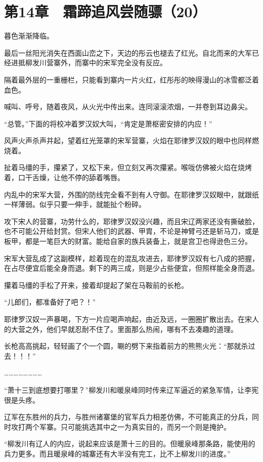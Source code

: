 \section{第14章　霜蹄追风尝随骠（20）}

暮色渐渐降临。

最后一丝阳光消失在西面山峦之下，天边的彤云也褪去了红光。自北而来的大军已经进抵柳发川营寨外，而寨中的宋军完全没有反应。

隔着最外层的一重栅栏，只能看到寨内一片火红，红彤彤的映得漫山的冰雪都泛着血色。

喊叫、呼号，随着夜风，从火光中传出来。连同滚滚浓烟，一并卷到耳边鼻尖。

“总管。”下面的将校冲着罗汉奴大叫，“肯定是萧枢密安排的内应！”

风声火声杀声并起，望着红光笼罩的宋军营寨，火焰在耶律罗汉奴的眼中也同样燃烧着。

扯着马缰的手，攥紧了，又松下来，但立刻又再次攥紧。喉咙仿佛被火焰在烧烤着，口干舌燥，让他不停的舔着嘴唇。

内乱中的宋军大营，外围的防线完全看不到有人守御。在耶律罗汉奴眼中，就跟纸一样薄弱。似乎只要一伸手，就能扯个粉碎。

攻下宋人的营寨，功劳什么的，耶律罗汉奴没兴趣，而且宋辽两家还没有撕破脸，也不可能公开给封赏。但宋人他们的武器、甲胄，不论是神臂弓还是斩马刀，或是板甲，都是一笔巨大的财富。能给自家的族兵装备上，就是宫卫也得逊色三分。

宋军大营乱成了这副模样，趁着现在的混乱攻进去，耶律罗汉奴有七八成的把握，在占尽便宜后能全身而退。剩下的两三成，则是少占些便宜，但照样能全身而退。

攥着马缰的手松了开来，接着却提起了架在马鞍前的长枪。

“儿郎们，都准备好了吧？！”

耶律罗汉奴一声暴喝，下方一片应喝声响起，由近及远，一圈圈扩散出去。在宋人的大营之外，他们早就忍耐不住了。里面那么热闹，哪有不去凑趣的道理。

长枪高高挑起，轻轻画了个一个圆，唰的劈下来指着前方的熊熊火光：“那就杀过去！！！”

……………………

“萧十三到底想要打哪里？”柳发川和暖泉峰同时传来辽军逼近的紧急军情，让李宪很是头疼。

辽军在东胜州的兵力，与胜州诸寨堡的官军兵力相差仿佛，不可能真正的分兵，同时攻打两个军寨。只可能挑选其中之一为真实目的，而另一个则是掩护。

“柳发川有辽人的内应，说起来应该是萧十三的目的。但暖泉峰那条路，能使用的兵力更多。而且暖泉峰的城寨还有大半没有完工，比不上柳发川的进度。”

